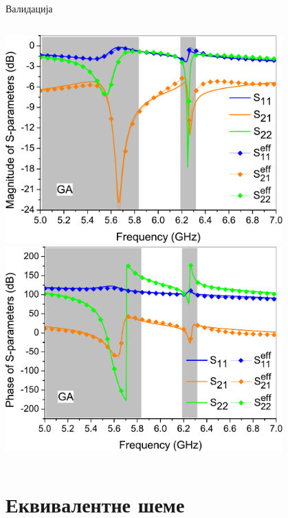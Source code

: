 \documentclass{beamer}
\begin{document}
\begin{frame}[t]{Валидација}
\begin{columns}[c]
\includegraphics[width=0.80\textwidth]{slike/val90ga_mag.pdf}
\includegraphics[width=0.80\textwidth]{slike/val90ga_ang.pdf}
\end{columns}
    
\end{frame}

\section{Еквивалентне шеме}
\end{document}
